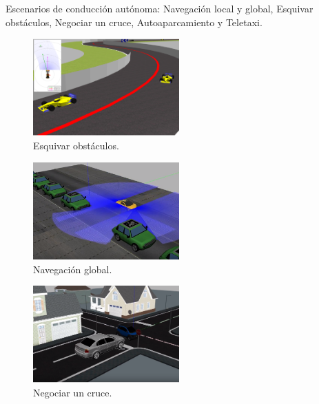 \documentclass[a4paper, 12pt]{book}
\begin{document}
Escenarios de conducción autónoma: Navegación local y global, Esquivar obstáculos, Negociar un cruce, Autoaparcamiento y Teletaxi.
\begin{figure}[H]
	\centering
	\includegraphics[width=0.5\textwidth]{img/obstacle}
	\caption{Esquivar obstáculos.}
\end{figure}
\begin{figure}[H]
	\centering
	\includegraphics[width=0.5\textwidth]{img/nav_global}
	\caption{Navegación global.}
\end{figure}
\begin{figure}[H]
	\centering
	\includegraphics[width=0.5\textwidth]{img/cruce}
	\caption{Negociar un cruce.}
\end{figure}
\end{document}

